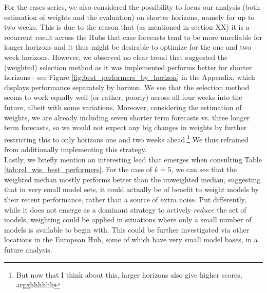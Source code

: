 For the cases series, we also considered the possibility to focus our analysis (both estimation of weights and the evaluation) on shorter horizons, namely for up to two weeks. This is due to the reason that (as mentioned in section XX) it is a recurrent result across the Hubs that case forecasts tend to be more unreliable for longer horizons and it thus might be desirable to optimize for the one and two week horizons. However, we observed no clear trend that suggested the (weighted) selection method as it was implemented performs better for shorter horizons - see Figure \ref{fig:best_performers_by_horizon} in the Appendix, which displays performance separately by horizon. We see that the selection method seems to work equally well (or rather, poorly) across all four weeks into the future, albeit with some variations. Moreover, considering the estimation of weights, we are already including seven shorter term forecasts vs. three longer term forecasts, so we would not expect any big changes in weights by further restricting this to only horizons one and two weeks ahead.\footnote{But now that I think about this, larger horizons also give higher scores, argghhhhhh} We thus refrained from additionally implementing this strategy. \medskip \\
Lastly, we briefly mention an interesting lead that emerges when consulting Table \ref{tab:rel_wis_best_performers}. For the case of $k = 5$, we can see that the weighted median mostly performs better than the unweighted median, suggesting that in very small model sets, it could actually be of benefit to weight models by their recent performance, rather than a source of extra noise. Put differently, while it does not emerge as a dominant strategy to actively $reduce$ the set of models, weighting could be applied in situations where only a small number of models is available to begin with. This could be further investigated via other locations in the European Hub, some of which have very small model bases, in a future analysis. \medskip\\
